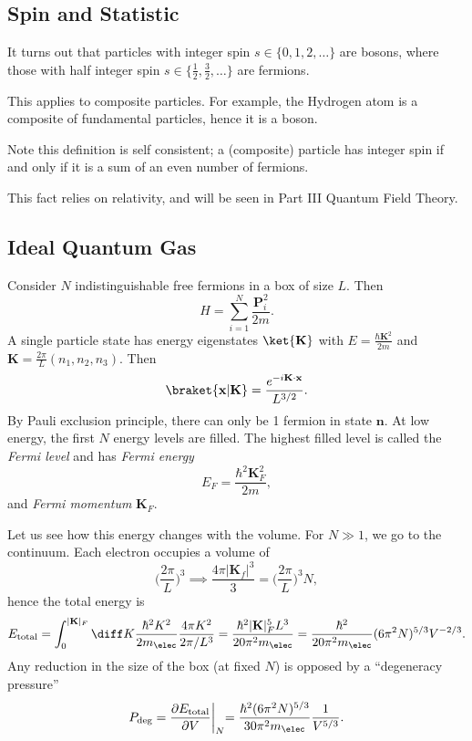 \documentclass[12pt]{article}
\begin{document}
\subsection{Spin and Statistic}
\label{sub:spin_stats}

It turns out that particles with integer spin $s \in \{0, 1, 2, \ldots\}$ are bosons, where those with half integer spin $s \in \{\frac{1}{2}, \frac{3}{2}, \ldots\}$ are fermions.

This applies to composite particles. For example, the Hydrogen atom is a composite of fundamental particles, hence it is a boson.

Note this definition is self consistent; a (composite) particle has integer spin if and only if it is a sum of an even number of fermions.

This fact relies on relativity, and will be seen in Part III Quantum Field Theory.

\subsection{Ideal Quantum Gas}
\label{sub:ideal_gas}

Consider $N$ indistinguishable free fermions in a box of size $L$. Then
\[
H = \sum_{i = 1}^{N} \frac{\mathbf{P}_i^2}{2m}.
\]
A single particle state has energy eigenstates $\ket{\mathbf{K}}$ with $E = \frac{\hbar \mathbf{K}^2}{2 m}$ and $\mathbf{K} = \frac{2\pi}{L} (n_1, n_2, n_3)$. Then
\[
	\braket{\mathbf{x} |\mathbf{K}} = \frac{e^{-i \mathbf{K} \cdot \mathbf{x}}}{L^{3/2}}.
\]
By Pauli exclusion principle, there can only be 1 fermion in state $\mathbf{n}$. At low energy, the first $N$ energy levels are filled. The highest filled level is called the \emph{Fermi level} and has \emph{Fermi energy}
\[
E_F = \frac{\hbar^2 \mathbf{K}_F^2}{2m},
\]
and \emph{Fermi momentum} $\mathbf{K}_F$.

Let us see how this energy changes with the volume. For $N \gg 1$, we go to the continuum. Each electron occupies a volume of
\[
\biggl( \frac{2 \pi}{L}\biggr)^{3} \implies \frac{4 \pi |\mathbf{K}_f|^3}{3} = \biggl( \frac{2 \pi}{L} \biggr)^3 N,
\]
hence the total energy is
\[
E_{\mathrm{total}} = \int_0^{|\mathbf{K}|_F} \diff K \frac{\hbar^2 K^2}{2 m_\elec} \frac{4 \pi K^2}{2\pi/L^3} = \frac{\hbar^2 |\mathbf{K}|_F^5 L^3}{20 \pi^2 m_\elec} = \frac{\hbar^2}{20 \pi^2 m_\elec}(6 \pi^2 N)^{5/3} V^{-2/3}.
\]
Any reduction in the size of the box (at fixed $N$) is opposed by a ``degeneracy pressure''
\[
P_{\mathrm{deg}} = \frac{\partial E_{\mathrm{total}}}{\partial V} \biggl|_N = \frac{\hbar^2 (6 \pi^2 N)^{5/3}}{30 \pi^2 m_\elec} \frac{1}{V^{5/3}}.
\]
\end{document}
